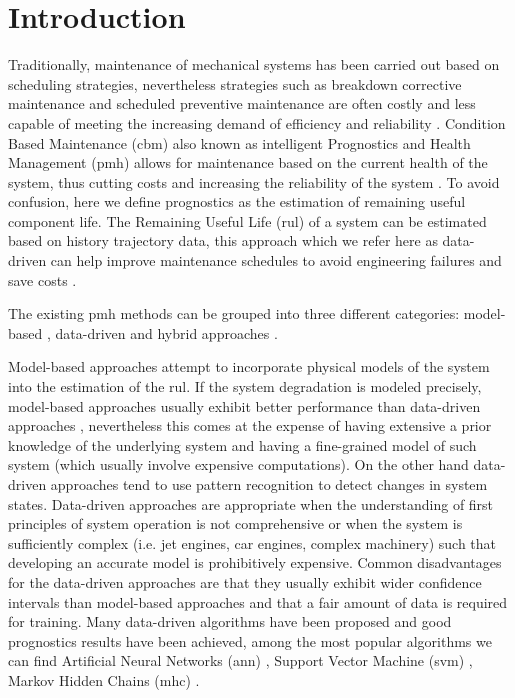 \section{Introduction}
\label{sec:rul_intro}

Traditionally, maintenance of mechanical systems has been carried out based on scheduling strategies, nevertheless strategies such as breakdown corrective maintenance and scheduled preventive maintenance are often costly and less capable of meeting the increasing demand of efficiency and reliability \cite{Gebraeel2005, Zaidan2013}. Condition Based Maintenance (\gls{cbm}) also known as intelligent Prognostics and Health Management (\gls{pmh}) allows for maintenance based on the current health of the system, thus cutting costs and increasing the reliability of the system \cite{Zhao2017}. To avoid confusion, here we define prognostics as the estimation of remaining useful component life. The Remaining Useful Life (\gls{rul}) of a system can be estimated based on history trajectory data, this approach which we refer here as data-driven can help improve maintenance schedules to avoid engineering failures and save costs \cite{Lee2014}.

The existing \gls{pmh} methods can be grouped into three different categories: model-based \cite{Yu2001} , data-driven \cite{Liu2009, Mosallam2013} and hybrid approaches \cite{Pecht2010, Liu2012}.

Model-based approaches attempt to incorporate physical models of the system into the estimation of the \gls{rul}. If the system degradation is modeled  precisely, model-based approaches usually exhibit better performance than data-driven approaches \cite{Qian2017}, nevertheless this comes at the expense of having extensive a prior knowledge of the underlying system and having a fine-grained model of such system (which usually involve expensive computations). On the other hand data-driven approaches tend to use pattern recognition to detect changes in system states. Data-driven approaches are appropriate when the understanding of first principles of system operation is not comprehensive or when the system is sufficiently complex (i.e. jet engines, car engines, complex machinery) such that developing an accurate model is prohibitively expensive. Common disadvantages for the data-driven approaches are that they usually exhibit wider confidence intervals than model-based approaches and that a fair amount of data is required for training. Many data-driven algorithms have been proposed and good prognostics results have been achieved, among the most popular algorithms we can find Artificial Neural Networks (\gls{ann}) \cite{Gebraeel2004}, Support Vector Machine (\gls{svm}) \cite{Benkedjouh2013}, Markov Hidden Chains (\gls{mhc}) \cite{Dong2007}.

